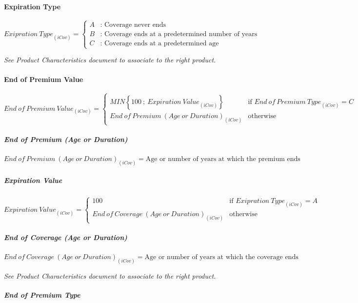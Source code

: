 \documentclass[10pt]{article}
\begin{document}
\paragraph{Expiration Type}

\[
{Exipration\ Type}_{\left(iCov\right)} = \begin{cases}
A & \text{: Coverage never ends} \\
B & \text{: Coverage ends at a predetermined number of years} \\
C & \text{: Coverage ends at a predetermined age}
\end{cases}
\]

\textit{See Product Characteristics document to associate to the right product.}

\paragraph{End of Premium Value}

\[
{End\ of\ Premium\ Value}_{\left(iCov\right)} = \begin{cases}
MIN\left\{100\ ;\ {Expiration\ Value}_{\left(iCov\right)}\right\} & \text{if } {End\ of\ Premium\ Type}_{\left(iCov\right)} = C \\
{End\ of\ Premium\ \left(Age\ or\ Duration\right)}_{\left(iCov\right)} & \text{otherwise}
\end{cases}
\]

\subparagraph{End of Premium (Age or Duration)}

\[
{End\ of\ Premium\ \left(Age\ or\ Duration\right)}_{\left(iCov\right)} = \text{Age or number of years at which the premium ends}
\]

\subparagraph{Expiration Value}

\[
{Expiration\ Value}_{\left(iCov\right)} = \begin{cases}
100 & \text{if } {Exipration\ Type}_{\left(iCov\right)} = A \\
{End\ of\ Coverage\ \left(Age\ or\ Duration\right)}_{\left(iCov\right)} & \text{otherwise}
\end{cases}
\]

\subparagraph{End of Coverage (Age or Duration)}

\[
{End\ of\ Coverage\ \left(Age\ or\ Duration\right)}_{\left(iCov\right)} = \text{Age or number of years at which the coverage ends}
\]

\textit{See Product Characteristics document to associate to the right product.}

\subparagraph{End of Premium Type}
\end{document}
